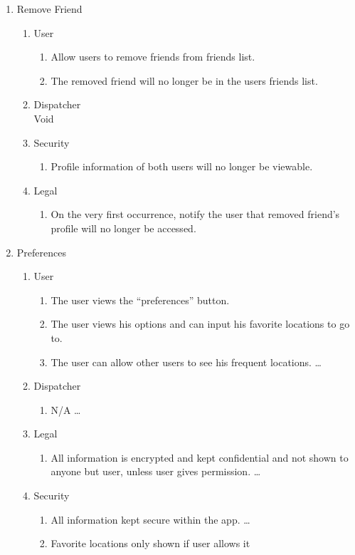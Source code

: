 \documentclass[english]{article}
\begin{document}
\begin{enumerate}[{BE}1.]
	\item Remove Friend
	\begin{enumerate}[{VP2}.1]
		\item User
			\begin{enumerate}
				\item Allow users to remove friends from friends list.
				\item The removed friend will no longer be in the users friends list.
			\end{enumerate}
		\item Dispatcher\\
			Void
		\item Security
			\begin{enumerate}
				\item Profile information of both users will no longer be viewable.
			\end{enumerate}
		\item Legal
			\begin{enumerate}
				\item On the very first occurrence, notify the user that removed friend's profile will
				no longer be accessed.
			\end{enumerate}
	\end{enumerate}
	
	\item Preferences 
	\begin{enumerate}[{VP2}.1]
		\item User
		\begin{enumerate}
			\item The user views the “preferences” button.
			\item The user views his options and can input his favorite locations to go to.
			\item The user can allow other users to see his frequent locations. \dots
		\end{enumerate}
		\item Dispatcher
		\begin{enumerate}
			\item N/A
			 \dots
		\end{enumerate}
		\item Legal
		\begin{enumerate}
			\item All information is encrypted and kept confidential and not shown to anyone but user, unless user gives permission. \dots
		\end{enumerate}
		\item Security
		\begin{enumerate}
			\item 	All information kept secure within the app.  \dots
			\item	Favorite locations only shown if user allows it
		\end{enumerate}
	\end{enumerate}


\end{enumerate}
\end{document}
